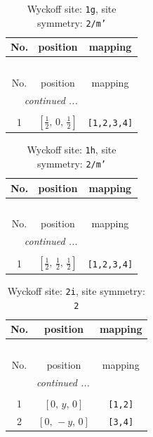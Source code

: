 \documentclass[fleqn,8pt]{jsarticle}
\begin{document}
\renewcommand{\arraystretch}{1.2}
\begin{longtable}{ccc}
\caption{Wyckoff site: {\tt 1g}, site symmetry: {\tt 2/m'}}
 \\
 \hline \hline
No. & position & mapping \\ \hline \endfirsthead

\multicolumn{2}{l}{\tablename\ \thetable{}} \\
 \hline \hline
No. & position & mapping \\ \hline \endhead

 \hline \hline
\multicolumn{2}{r}{\footnotesize\it continued ...} \\ \endfoot

 \hline \hline
\multicolumn{2}{r}{} \\ \endlastfoot

1 & $\left[ \frac{1}{2},\, 0,\, \frac{1}{2} \right]$ & {\tt [1,2,3,4]} \\
\end{longtable}
\renewcommand{\arraystretch}{1.2}
\begin{longtable}{ccc}
\caption{Wyckoff site: {\tt 1h}, site symmetry: {\tt 2/m'}}
 \\
 \hline \hline
No. & position & mapping \\ \hline \endfirsthead

\multicolumn{2}{l}{\tablename\ \thetable{}} \\
 \hline \hline
No. & position & mapping \\ \hline \endhead

 \hline \hline
\multicolumn{2}{r}{\footnotesize\it continued ...} \\ \endfoot

 \hline \hline
\multicolumn{2}{r}{} \\ \endlastfoot

1 & $\left[ \frac{1}{2},\, \frac{1}{2},\, \frac{1}{2} \right]$ & {\tt [1,2,3,4]} \\
\end{longtable}
\renewcommand{\arraystretch}{1.2}
\begin{longtable}{ccc}
\caption{Wyckoff site: {\tt 2i}, site symmetry: {\tt 2}}
 \\
 \hline \hline
No. & position & mapping \\ \hline \endfirsthead

\multicolumn{2}{l}{\tablename\ \thetable{}} \\
 \hline \hline
No. & position & mapping \\ \hline \endhead

 \hline \hline
\multicolumn{2}{r}{\footnotesize\it continued ...} \\ \endfoot

 \hline \hline
\multicolumn{2}{r}{} \\ \endlastfoot

1 & $\left[ 0,\, y,\, 0 \right]$ & {\tt [1,2]} \\ \hline
2 & $\left[ 0,\, - y,\, 0 \right]$ & {\tt [3,4]} \\
\end{longtable}
\end{document}
